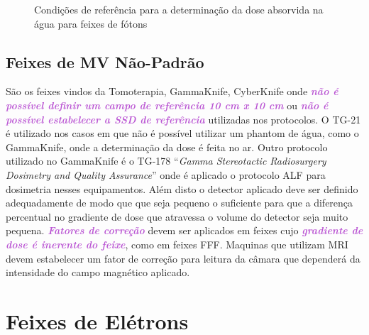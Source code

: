 \documentclass[11pt,a4paper]{article}
\begin{document}
	\begin{figure}[h]
		\centering
		\caption{Condições de referência para a determinação da dose absorvida na água para feixes de fótons}
		\label{fig:condicoesReferenciasDoseFotons}
	\end{figure}

	\subsection{Feixes de MV Não-Padrão}

		São os feixes vindos da Tomoterapia, GammaKnife, CyberKnife onde \textcolor{MediumOrchid}{\textbf{\textit{não é possível definir um campo de referência 10 cm x 10 cm}}} ou \textcolor{MediumOrchid}{\textbf{\textit{não é possível estabelecer a SSD de referência}}} utilizadas nos protocolos. O TG-21 é utilizado nos casos em que não é possível utilizar um phantom de água, como o GammaKnife, onde a determinação da dose é feita no ar. Outro protocolo utilizado no GammaKnife é o TG-178 ``\textit{Gamma Stereotactic Radiosurgery Dosimetry and Quality Assurance}'' onde é aplicado o protocolo ALF para dosimetria nesses equipamentos. Além disto o detector aplicado deve ser definido adequadamente de modo que que seja pequeno o suficiente para que a diferença percentual no gradiente de dose que atravessa o volume do detector seja muito pequena. \textcolor{MediumOrchid}{\textbf{\textit{Fatores de correção}}} devem ser aplicados em feixes cujo \textcolor{MediumOrchid}{\textbf{\textit{gradiente de dose é inerente do feixe}}}, como em feixes FFF. Maquinas que utilizam MRI devem estabelecer um fator de correção para leitura da câmara que dependerá da intensidade do campo magnético aplicado.
	

	\section{Feixes de Elétrons}
\end{document}
